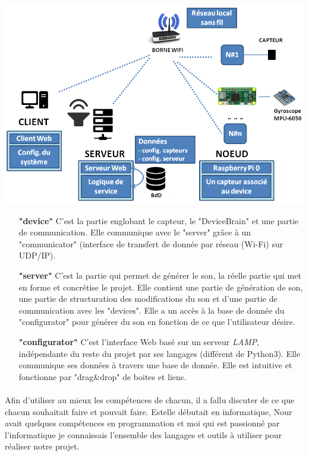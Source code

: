 \documentclass[12pt]{article}
\begin{document}
	\vspace{1cm}
	\noindent
	\includegraphics[width=\textwidth]{overall_sheme}
	\vspace{1cm}
	\begin{itemize}
		\item[\textbf{"device"}] C'est la partie englobant le capteur, le "DeviceBrain" et une partie de communication. Elle communique avec le "server" grâce à un "communicator" (interface de transfert de donnée par réseau (Wi-Fi) sur UDP/IP).\\
		\item[\textbf{"server"}] C'est la partie qui permet de générer le son, la réelle partie qui met en forme et concrétise le projet. Elle contient une partie de génération de son, une partie de structuration des modifications du son et d'une partie de communication avec les "devices". Elle a un accès à la base de donnée du "configurator" pour générer du son en fonction de ce que l'utilisateur désire.\\
		\item[\textbf{"configurator"}] C'est l'interface Web basé sur un serveur \textit{LAMP}, indépendante du reste du projet par ses langages (différent de Python3). Elle communique ses données à travers une base de donnée. Elle est intuitive et fonctionne par "drag\&drop" de boites et liens.
	\end{itemize}
	
	\paragraph{}
	Afin d’utiliser au mieux les compétences de chacun, il a fallu discuter de ce que chacun souhaitait faire et pouvait faire. Estelle débutait en informatique, Nour avait quelques compétences en programmation et moi qui est passionné par l’informatique je connaissais l’ensemble des langages et outils à utiliser pour réaliser notre projet.
	
\end{document}
